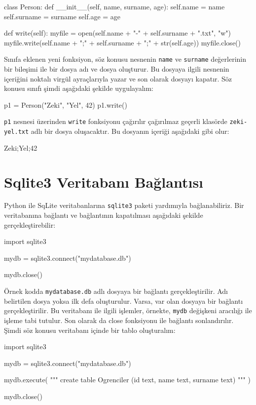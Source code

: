 \documentclass[12pt]{report}
\begin{document}
\begin{python}
class Person:
	def __init__(self, name, surname, age):
		self.name = name
		self.surname = surname
		self.age = age

	def write(self):	
		myfile = open(self.name + "-" + self.surname + ".txt", "w")	
		myfile.write(self.name + ";" + self.surname + ";" + str(self.age))
		myfile.close()
\end{python}	

Sınıfa eklenen yeni fonksiyon, söz konusu nesnenin \texttt{name} ve \texttt{surname} değerlerinin bir bileşimi ile bir dosya adı ve dosya oluşturur. Bu dosyaya ilgili nesnenin içeriğini noktalı virgül ayraçlarıyla yazar ve son olarak dosyayı kapatır. Söz konusu sınıfı şimdi aşağıdaki şekilde uygulayalım:

\begin{python}
p1 = Person("Zeki", "Yel", 42)
p1.write()
\end{python}

\texttt{p1} nesnesi üzerinden \texttt{write} fonksiyonu çağırılır çağırılmaz geçerli klasörde  \texttt{zeki-yel.txt} adlı bir dosya oluşacaktır. Bu dosyanın içeriği aşağıdaki gibi olur:

\begin{python}
Zeki;Yel;42
\end{python}


\section{Sqlite3 Veritabanı Bağlantısı}
Python ile SqLite veritabanlarına \texttt{sqlite3} paketi yardımıyla bağlanabiliriz. Bir veritabanına bağlantı ve bağlantının kapatılması aşağıdaki şekilde gerçekleştirebilir:

\begin{python}
import sqlite3

mydb = sqlite3.connect("mydatabase.db")

mydb.close()
\end{python}

Örnek kodda \texttt{mydatabase.db} adlı dosyaya bir bağlantı gerçekleştirilir. Adı belirtilen dosya yoksa ilk defa oluşturulur. Varsa, var olan dosyaya bir bağlantı gerçekleştirilir. Bu veritabanı ile ilgili işlemler, örnekte, \texttt{mydb} değişkeni aracılığı ile işleme tabi tutulur. Son olarak da close fonksiyonu ile bağlantı sonlandırılır. 
Şimdi söz konusu veritabanı içinde bir tablo oluşturalım:

\begin{python}
	import sqlite3
	
	mydb = sqlite3.connect("mydatabase.db")
	
	mydb.execute(
	"""
	create table Ogrenciler
	(id text, name text, surname text)
	"""
	)
	
	mydb.close()
\end{python}
\end{document}
